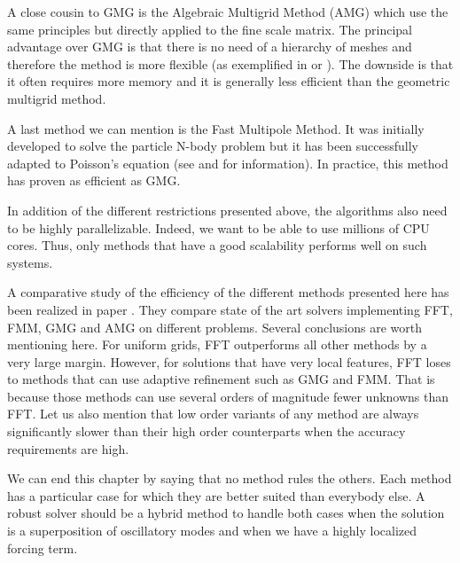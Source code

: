 A close cousin to GMG is the Algebraic Multigrid Method (AMG) which use the same principles but directly applied to the fine scale matrix. The principal advantage over GMG is that there is no need of a hierarchy of meshes and therefore the method is more flexible (as exemplified in \cite{flexiAlg} or \cite{amg}). The downside is that it often requires more memory and it is generally less efficient than the geometric multigrid method. 

A last method we can mention is the Fast Multipole Method. It was initially developed to solve the particle N-body problem but it has been successfully adapted to Poisson's equation (see \cite{fmm1} and \cite{fmm2} for information). In practice, this method has proven as efficient as GMG.

In addition of the different restrictions presented above, the algorithms also need to be highly parallelizable. Indeed, we want to be able to use millions of CPU cores. Thus, only methods that have a good scalability performs well on such systems.

A comparative study of the efficiency of the different methods presented here has been realized in paper \cite{compa}. They compare state of the art solvers implementing FFT, FMM, GMG and AMG on different problems. Several conclusions are worth mentioning here. For uniform grids, FFT outperforms all other methods by a very large margin. However, for solutions that have very local features, FFT loses to methods that can use adaptive refinement such as GMG and FMM. That is because those methods can use several orders of magnitude fewer unknowns than FFT. Let us also mention that low order variants of any method are always significantly slower than their high order counterparts when the accuracy requirements are high.  

We can end this chapter by saying that no method rules the others. Each method has a particular case for which they are better suited than everybody else. A robust solver should be a hybrid method to handle both cases when the solution is a superposition of oscillatory modes and when we have a highly localized forcing term.



 

